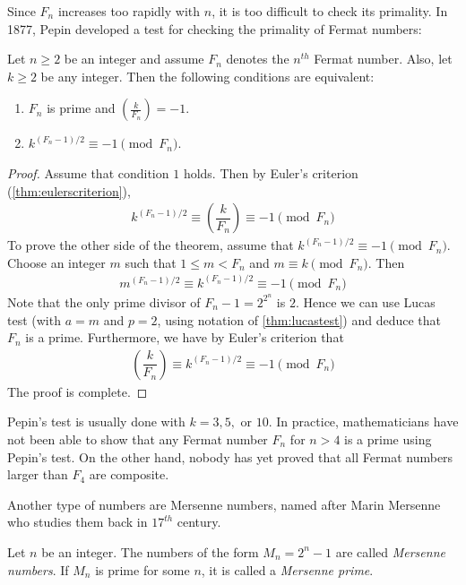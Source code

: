 \documentclass{subfiles}
\begin{document}
	Since $F_n$ increases too rapidly with $n$, it is too difficult to check its primality. In 1877, Pepin developed a test for checking the primality of Fermat numbers:

		\begin{theorem}
			Let $n \geq 2$ be an integer and assume $F_n$ denotes the $n^{th}$ Fermat number. Also, let $k \geq 2$ be any integer. Then the following conditions are equivalent:
				\begin{enumerate}[1.]
					\item $F_n$ is prime and $\left(\frac{k}{F_n}\right)=-1$.
					\item $k^{(F_n-1)/2} \equiv -1 \pmod{F_n}$.
				\end{enumerate}
		\end{theorem}

		\begin{proof}
			Assume that condition $1$ holds. Then by Euler's criterion (\autoref{thm:eulerscriterion}),
				\begin{align*}
					k^{(F_n-1)/2} \equiv \left(\dfrac{k}{F_n}\right) \equiv -1 \pmod{F_n}
				\end{align*}
			To prove the other side of the theorem, assume that $k^{(F_n-1)/2} \equiv -1 \pmod{F_n}$. Choose an integer $m$ such that $1 \leq  m <F_n$ and $m \equiv k \pmod{F_n}$. Then
				\begin{align*}
					m^{(F_n-1)/2} \equiv k^{(F_n-1)/2} \equiv -1 \pmod{F_n}
				\end{align*}
			Note that the only prime divisor of $F_n-1 = 2^{2^n}$ is $2$. Hence we can use Lucas test (with $a=m$ and $p=2$, using notation of \autoref{thm:lucastest}) and deduce that $F_n$ is a prime. Furthermore, we have by Euler's criterion that
				\begin{align*}
					\left(\dfrac{k}{F_n}\right) \equiv	k^{(F_n-1)/2}  \equiv -1 \pmod{F_n}
				\end{align*}
			The proof is complete.
		\end{proof}

	Pepin's test is usually done with $k=3, 5,$ or $10$. In practice, mathematicians have not been able to show that any Fermat number $F_n$ for $n>4$ is a prime using Pepin's test. On the other hand, nobody has yet proved that all Fermat numbers larger than $F_4$ are composite.

	Another type of numbers are Mersenne numbers, named after Marin Mersenne who studies them back in $17^{th}$ century.
		\begin{definition}
			Let $n$ be an integer. The numbers of the form $M_n = 2^n -1$ are called \textit{Mersenne numbers}. If $M_n$ is prime for some $n$, it is called a \textit{Mersenne prime}.
		\end{definition}
\end{document}
